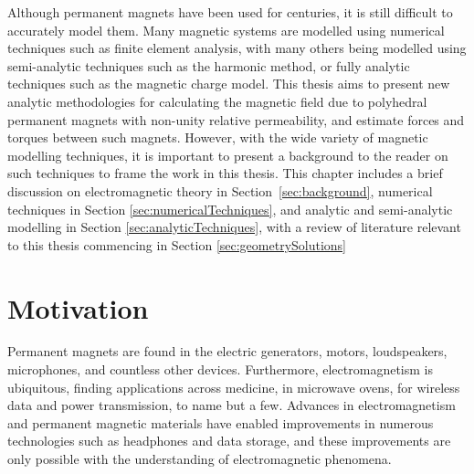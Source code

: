 
Although permanent magnets have been used for centuries, it is still difficult to accurately model them. Many magnetic systems are modelled using numerical techniques such as finite element analysis, with many others being modelled using semi-analytic techniques such as the harmonic method, or fully analytic techniques such as the magnetic charge model. This thesis aims to present new analytic methodologies for calculating the magnetic field due to polyhedral permanent magnets with non-unity relative permeability, and estimate forces and torques between such magnets. However, with the wide variety of magnetic modelling techniques, it is important to present a background to the reader on such techniques to frame the work in this thesis. This chapter includes a brief discussion on electromagnetic theory in Section~\ref{sec:background}, numerical techniques in Section \ref{sec:numericalTechniques}, and analytic and semi-analytic modelling in Section \ref{sec:analyticTechniques}, with a review of literature relevant to this thesis commencing in Section \ref{sec:geometrySolutions}


\section{Motivation}

Permanent magnets are found in the electric generators, motors, loudspeakers, microphones, and countless other devices. Furthermore, electromagnetism is ubiquitous, finding applications across medicine, in microwave ovens, for wireless data and power transmission, to name but a few. Advances in electromagnetism and permanent magnetic materials have enabled improvements in numerous technologies such as headphones and data storage, and these improvements are only possible with the understanding of electromagnetic phenomena.


